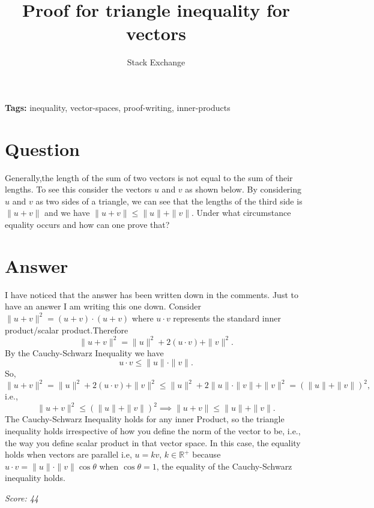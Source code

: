 \documentclass{article}
\title{Proof for triangle inequality for vectors}
\author{Stack Exchange}
\date{}
\begin{document}
\maketitle

\noindent\textbf{Tags:} inequality, vector-spaces, proof-writing, inner-products

\section*{Question}
Generally,the length of the sum of two vectors is not equal to the sum of their lengths. To see this consider the vectors $u$ and $v$ as shown below. By considering $u$ and $v$ as two sides of a triangle, we can see that the lengths of the third side is $\| u + v \|$ and we have $\| u + v \| \leq \|u\| + \|v\|$. Under what circumstance equality occurs and how can one prove that?

\section*{Answer}
I have noticed that the answer has been written down in the comments. Just to have an answer I am writing this one down. Consider $\|u+v\|^2=(u+v) \cdot (u+v)$ where $u \cdot v$ represents the standard inner product/scalar product.Therefore $$\|u+v\|^2=\|u\|^2+2 (u \cdot v) + \|v\|^2 .$$ By the Cauchy-Schwarz Inequality we have $$u \cdot v \leq \|u\| \cdot \|v\|.$$ So, $$\|u+v \|^2= \|u\|^2+2(u \cdot v)+ \|v \|^2 \leq \|u\|^2+ 2 \|u\| \cdot \|v\| + \|v\|^2=(\|u\|+ \|v\|)^2 ,$$ i.e., $$\|u+v\|^2 \leq (\|u\|+ \|v\|)^2 \implies \|u+v\| \leq \|u \|+ \|v\| .$$ The Cauchy-Schwarz Inequality holds for any inner Product, so the triangle inequality holds irrespective of how you define the norm of the vector to be, i.e., the way you define scalar product in that vector space. In this case, the equality holds when vectors are parallel i.e, $u=kv$, $k \in \mathbb{R}^+$ because $u \cdot v= \|u \| \cdot \|v\| \cos \theta$ when $\cos \theta=1$, the equality of the Cauchy-Schwarz inequality holds.

\vspace{1em}
\noindent\textit{Score: 44}
\end{document}
